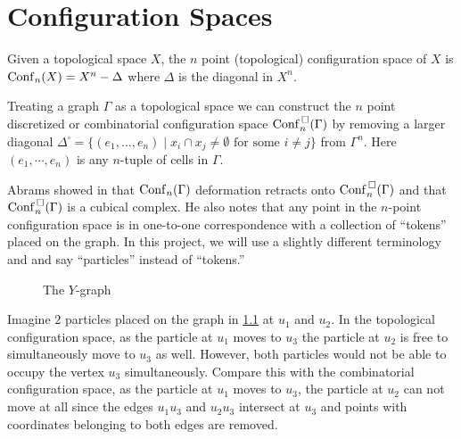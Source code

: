 \chapter{Configuration Spaces}
Given a topological space \(X\), the \(n\) point (topological) configuration space of \(X\) is
\(\mathrm{Conf}_n(X) = X^n - \Delta\) where \(\Delta\) is the diagonal in \(X^n\).

Treating a graph \(\Gamma\) as a topological space we can construct the
\(n\) point discretized or combinatorial configuration space \(\mathrm{Conf}^{\,\square}_n(\Gamma)\) by 
removing a larger diagonal \(\Delta^{\square} = \{(e_1, \ldots, e_n) \mid x_i \cap x_j \neq \emptyset \text{ for some } i \neq j\}\)
from \(\Gamma^n\). Here \((e_1, \cdots, e_n)\) is any \(n\)-tuple of cells in \(\Gamma\).

Abrams showed in \cite{abrams2000configurationspaces} that \(\mathrm{Conf}_n(\Gamma)\) deformation retracts onto \(\mathrm{Conf}^{\,\square}_n(\Gamma)\) and
that \(\mathrm{Conf}^{\,\square}_n(\Gamma)\) is a cubical complex.
He also notes that any point in the
\(n\)-point configuration space is in one-to-one correspondence with a
collection of ``tokens'' placed on the graph. In this project, we will use a slightly different terminology and
and say ``particles'' instead of ``tokens.''


\begin{figure}[h!]
\centering
{}
\caption{The \(Y\)-graph}
\label{fig:ygraph}
\end{figure}
Imagine \(2\) particles placed on the graph in \ref{fig:ygraph} at \(u_1\) and \(u_2\).  
In the topological configuration space, as the particle at \(u_1\) moves to \(u_3\)
the particle at \(u_2\) is free to simultaneously move to \(u_3\) as well. 
However, both particles would not be able to occupy the vertex \(u_3\) simultaneously.  
Compare this with the combinatorial configuration space, as the
particle at \(u_1\) moves to \(u_3\), the particle at \(u_2\) can not move at
all since the edges \(u_1 u_3\) and \(u_2 u_3\) intersect at \(u_3\) and points
with coordinates belonging to both edges are removed.

